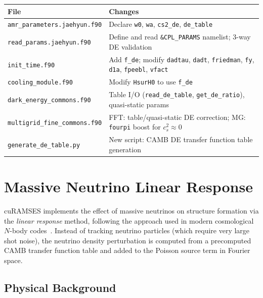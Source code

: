 \documentclass[11pt,fleqn]{book}
\begin{document}
\begin{longtable}{L{6.5cm} L{7cm}}
\toprule
\textbf{File} & \textbf{Changes} \\
\midrule
\endhead
\texttt{amr\_parameters.jaehyun.f90} & Declare \texttt{w0}, \texttt{wa}, \texttt{cs2\_de}, \texttt{de\_table} \\
\texttt{read\_params.jaehyun.f90} & Define and read \texttt{\&CPL\_PARAMS} namelist; 3-way DE validation \\
\texttt{init\_time.f90} & Add \texttt{f\_de}; modify \texttt{dadtau}, \texttt{dadt}, \texttt{friedman}, \texttt{fy}, \texttt{d1a}, \texttt{fpeebl}, \texttt{vfact} \\
\texttt{cooling\_module.f90} & Modify \texttt{HsurH0} to use \texttt{f\_de} \\
\texttt{dark\_energy\_commons.f90} & Table I/O (\texttt{read\_de\_table}, \texttt{get\_de\_ratio}), quasi-static params \\
\texttt{multigrid\_fine\_commons.f90} & FFT: table/quasi-static DE correction; MG: \texttt{fourpi} boost for $c_s^2 \approx 0$ \\
\texttt{generate\_de\_table.py} & New script: CAMB DE transfer function table generation \\
\bottomrule
\end{longtable}


\chapter{Massive Neutrino Linear Response}
\label{ch:neutrino}

cuRAMSES implements the effect of massive neutrinos on structure formation
via the \emph{linear response} method, following the approach used in
modern cosmological $N$-body codes~\cite{AliHaimoud2013,Bird2018}.
Instead of tracking neutrino particles (which require very large shot
noise), the neutrino density perturbation is computed from a precomputed
CAMB transfer function table and added to the Poisson source term in
Fourier space.

\section{Physical Background}
\end{document}

